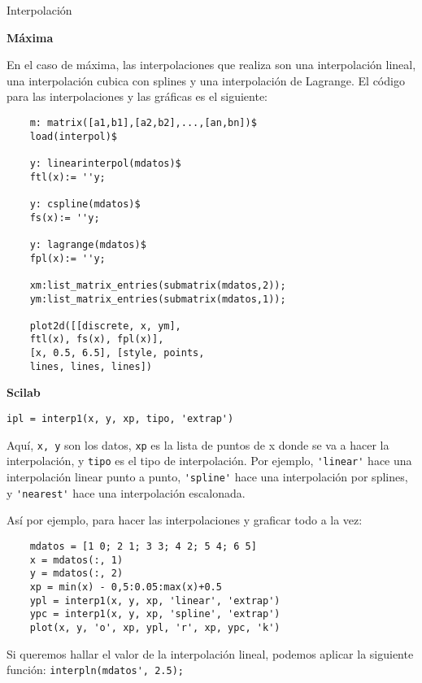 \documentclass[a4paper]{article}
\begin{document}
\begin{center}
	Interpolación
\end{center}
\raggedright
\begin{multicols}{2}
	\begin{center}
		\textbf{Máxima}
	\end{center}
	En el caso de máxima, las interpolaciones que realiza son una interpolación lineal, una interpolación cubica con splines y una interpolación de Lagrange. El código para las interpolaciones y las gráficas es el siguiente:
	
	\begin{verbatim}
	m: matrix([a1,b1],[a2,b2],...,[an,bn])$
	load(interpol)$
	
	y: linearinterpol(mdatos)$
	ftl(x):= ''y;
	
	y: cspline(mdatos)$
	fs(x):= ''y;
	
	y: lagrange(mdatos)$
	fpl(x):= ''y;
	
	xm:list_matrix_entries(submatrix(mdatos,2));
	ym:list_matrix_entries(submatrix(mdatos,1));
	
	plot2d([[discrete, x, ym], 
	ftl(x), fs(x), fpl(x)], 
	[x, 0.5, 6.5], [style, points, 
	lines, lines, lines])
	\end{verbatim}
	
	\begin{center}
		\textbf{Scilab}
	\end{center}
	
	\verb|ipl = interp1(x, y, xp, tipo, 'extrap')|
	
	Aquí, \verb|x, y| son los datos, \verb|xp| es la lista de puntos de x donde se va a hacer la interpolación, y \verb|tipo| es el tipo de interpolación. Por ejemplo, \verb|'linear'| hace una interpolación linear punto a punto, \verb|'spline'| hace una interpolación por splines, y \verb|'nearest'| hace una interpolación escalonada.
	
	Así por ejemplo, para hacer las interpolaciones y graficar todo a la vez:
		
	\begin{verbatim}
	mdatos = [1 0; 2 1; 3 3; 4 2; 5 4; 6 5]
	x = mdatos(:, 1)
	y = mdatos(:, 2)
	xp = min(x) - 0,5:0.05:max(x)+0.5
	ypl = interp1(x, y, xp, 'linear', 'extrap')
	ypc = interp1(x, y, xp, 'spline', 'extrap')
	plot(x, y, 'o', xp, ypl, 'r', xp, ypc, 'k')
	\end{verbatim}
	
	Si queremos hallar el valor de la interpolación lineal, podemos aplicar la siguiente función:
	\verb|interpln(mdatos', 2.5);|
	
\end{multicols}
\end{document}
